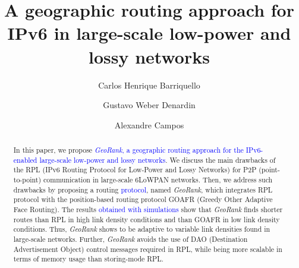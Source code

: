 \documentclass[final,authoryear,3p,twocolumn]{elsarticle}
\newcommand{\rev}{\textcolor{blue}}
\begin{document}
\begin{frontmatter}



\title{A geographic routing approach for IPv6 in large-scale low-power and lossy networks}



\author[addr1]{Carlos Henrique Barriquello}
\author[addr2]{Gustavo Weber Denardin}
\author[addr1]{Alexandre Campos}
\address[addr1]{Electronic Ballast Researching Group (GEDRE) - Intelligence in Lighting, Federal University of Santa Maria(UFSM), Santa Maria, RS, 97105-900, Brazil}
\address[addr2]{Technological Federal University of Paran$\acute{a}$, Pato Branco, PR, 85503-390, Brazil}


\begin{abstract}
In this paper, we propose \rev{\textit{GeoRank}, a geographic routing approach for the IPv6-enabled large-scale  low-power and lossy networks}. We discuss the main drawbacks of the RPL (IPv6 Routing Protocol for
Low-Power and Lossy Networks) for P2P (point-to-point) communication in large-scale 6LoWPAN networks. Then, we address such drawbacks by proposing a routing \rev{protocol}, named \textit{GeoRank}, which integrates RPL protocol with the position-based routing protocol GOAFR (Greedy Other Adaptive Face Routing). The results \rev{obtained with simulations} show that \textit{GeoRank} finds shorter routes than RPL in high link density conditions and than GOAFR in low link density conditions. Thus, \textit{GeoRank} shows to be adaptive to variable link densities found in large-scale networks. Further, \textit{GeoRank} avoids the use of DAO (Destination Advertisement Object) control messages required in RPL, while being more scalable in terms of memory usage than storing-mode RPL.
\end{abstract}




\end{frontmatter}
\end{document}
